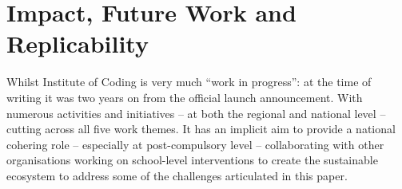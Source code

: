 \documentclass[conference]{IEEEtran}
\begin{document}





\section{Impact, Future Work and Replicability}\label{concl}

Whilst Institute of Coding is very much ``work in progress'': at the time
of writing it was two years on from the official launch
announcement.  With numerous activities and initiatives -- at both the
regional and national level -- cutting across all five work themes. It
has an implicit aim to provide a national cohering role -- especially
at post-compulsory level -- collaborating with other organisations
working on school-level interventions to create the sustainable
ecosystem to address some of the challenges articulated in this paper.
\end{document}
